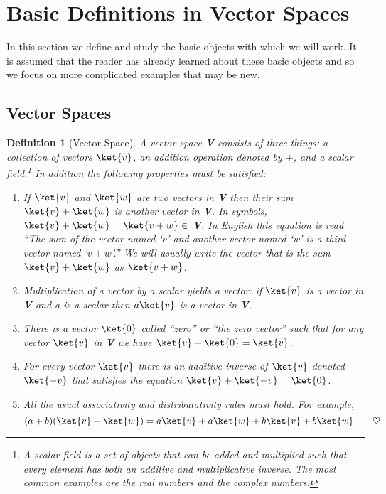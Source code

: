 \section{Basic Definitions in Vector Spaces}
In this section we define and study the basic objects with which we will work.
It is assumed that the reader has already learned about these basic objects and so we focus on more complicated examples that may be new.

\subsection{Vector Spaces}

\newtheorem{definition}{Definition}
\begin{definition}[Vector Space]
A vector space \textbf{V} consists of three things: a collection of vectors $\ket{v}$, an addition operation denoted by $+$, and a scalar field.\footnote{A scalar field is a set of objects that can be added and multiplied such that every element has both an additive and multiplicative inverse.  The most common examples are the real numbers and the complex numbers.}
In addition the following properties must be satisfied:
\begin{enumerate}
\item If $\ket{v}$ and $\ket{w}$ are two vectors in \textbf{V} then their sum $\ket{v} + \ket{w}$ is another vector in \textbf{V}.
In symbols, $\ket{v} + \ket{w} = \ket{v+w} \in$ \textbf{V}.
In English this equation is read ``The sum of the vector named `v' and another vector named `w' is a third vector named `$v+w$'.''
We will usually write the vector that is the sum $\ket{v} + \ket{w}$ as $\ket{v+w}$.
\item Multiplication of a vector by a scalar yields a vector: if $\ket{v}$ is a vector in \textbf{V} and a is a scalar then $a\ket{v}$ is a vector in \textbf{V}.
\item There is a vector $\ket{0}$ called ``zero'' or ``the zero vector'' such that for any vector $\ket{v}$ in \textbf{V} we have $\ket{v} + \ket{0} = \ket{v}$.
\item For every vector $\ket{v}$ there is an additive inverse of $\ket{v}$ denoted $\ket{-v}$ that satisfies the equation $\ket{v} + \ket{-v} = \ket{0}$.
\item All the usual associativity and distributativity rules must hold.
For example,
\begin{equation}
(a+b)(\ket{v} + \ket{w}) = a\ket{v} + a\ket{w} + b\ket{v} + b\ket{w} \qquad \heartsuit
\end{equation}
\end{enumerate}
\end{definition}

